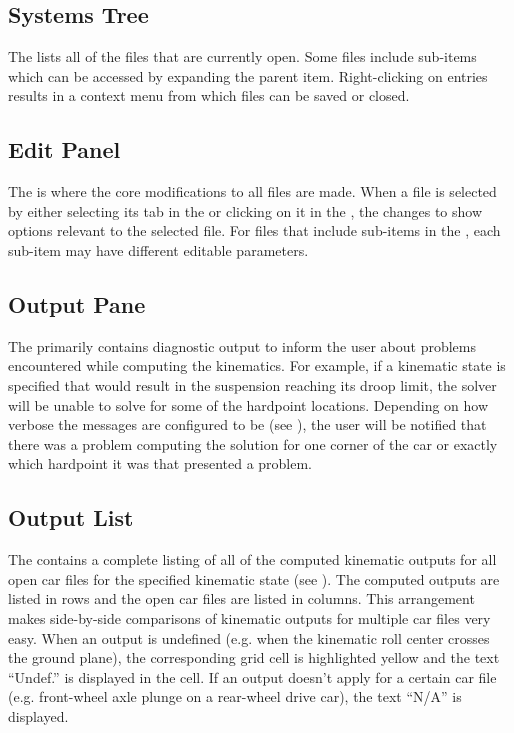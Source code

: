 \subsection{Systems Tree} \label{ssec:systemsTree}

The  lists all of the files that are currently open.  Some files include sub-items which can be accessed by expanding the parent item.  Right-clicking on  entries results in a context menu from which files can be saved or closed.

\subsection{Edit Panel} \label{ssec:editPanel}

The  is where the core modifications to all files are made.  When a file is selected by either selecting its tab in the  or clicking on it in the , the  changes to show options relevant to the selected file.  For files that include sub-items in the , each sub-item may have different editable parameters.

\subsection{Output Pane} \label{ssec:outputPane}

The  primarily contains diagnostic output to inform the user about problems encountered while computing the kinematics.  For example, if a kinematic state is specified that would result in the suspension reaching its droop limit, the solver will be unable to solve for some of the hardpoint locations.  Depending on how verbose the messages are configured to be (see ), the user will be notified that there was a problem computing the solution for one corner of the car or exactly which hardpoint it was that presented a problem.

\subsection{Output List} \label{ssec:outputList}

The  contains a complete listing of all of the computed kinematic outputs for all open car files for the specified kinematic state (see ).  The computed outputs are listed in rows and the open car files are listed in columns.  This arrangement makes side-by-side comparisons of kinematic outputs for multiple car files very easy.  When an output is undefined (e.g. when the kinematic roll center crosses the ground plane), the corresponding grid cell is highlighted yellow and the text ``Undef.'' is displayed in the cell.  If an output doesn't apply for a certain car file (e.g. front-wheel axle plunge on a rear-wheel drive car), the text ``N/A'' is displayed.

